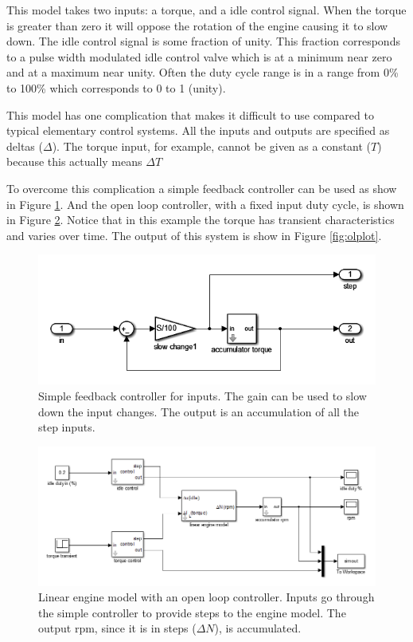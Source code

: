 \documentclass{article}
\begin{document}
This model takes two inputs: a torque, and a idle control signal.
When the torque is greater than zero it will oppose the rotation of
the engine causing it to slow down.
The idle control signal is some fraction of unity.
This fraction corresponds to a pulse width modulated idle control valve
which is at a minimum near zero and at a maximum near unity.
Often the duty cycle range is in a range from 0\% to 100\% which
corresponds to 0 to 1 (unity).

This model has one complication that makes it difficult to use compared
to typical elementary control systems.
All the inputs and outputs are specified as deltas ($\Delta$).
The torque input, for example, cannot be given as a constant ($T$) because this
actually means $\Delta T$

To overcome this complication a simple feedback controller can be used
as show in Figure \ref{fig:scont}.
And the open loop controller, with a fixed input duty cycle, is shown
in Figure \ref{fig:openloop}.
Notice that in this example the torque has transient characteristics and
varies over time.
The output of this system is show in Figure \ref{fig:olplot}.

\clearpage
\begin{figure}[!htbp]
\begin{center}
\includegraphics[scale=0.6]{img/schematic-control-ed1}
\end{center}
\caption{Simple feedback controller for inputs.
The gain can be used to slow down the input changes.
The output is an accumulation of all the step inputs.}
\label{fig:scont}
\end{figure}

\begin{figure}[!htbp]
\begin{center}
\includegraphics[scale=0.5]{img/schematic-no_control-ed1}
\end{center}
\caption{Linear engine model with an open loop controller.
Inputs go through the simple controller to provide steps to the
engine model.
The output rpm, since it is in steps ($\Delta N$), is accumulated.}
\label{fig:openloop}
\end{figure}
\end{document}
